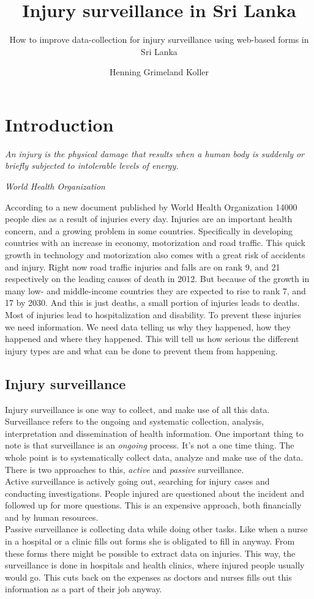 \documentclass[UKenglish, 12pt]{article}
\title{Injury surveillance in Sri Lanka}
\subtitle{How to improve data-collection for injury surveillance
using web-based forms in Sri Lanka}
\author{Henning Grimeland Koller}
\newcommand{\WHO}{World Health Organization }
\begin{document}
\ififorside{}
\newpage

\section*{Introduction} 
\epigraph{ \textit{An injury is the physical damage that
results when a human body is suddenly or briefly subjected to intolerable
levels of energy.}}{\textit{\WHO\cite{who-guide}}}

According to a new document published by \WHO\cite{who-article} 14000 people
dies as a result of injuries every day.  Injuries are an important health
concern, and a growing problem in some countries. Specifically in developing
countries with an increase in economy, motorization and road traffic.  This
quick growth in technology and motorization also comes with a great risk of
accidents and injury.  Right now road traffic injuries and falls are on rank 9,
and 21 respectively on the leading causes of death in
2012.\cite[4]{who-article} But because of the growth in many low- and
middle-income countries they are expected to rise to rank 7, and 17 by 2030.
And this is just deaths, a small portion of injuries leads to deaths. Most of
injuries lead to hospitalization and disability.  To prevent these injuries we
need information. We need data telling us why they happened, how they happened
and where they happened.  This will tell us how serious the different injury
types are and what can be done to prevent them from happening.

\subsection*{Injury surveillance}
Injury surveillance is one way to collect, and
make use of all this data.  Surveillance refers to the ongoing and systematic
collection, analysis, interpretation and dissemination of health
information.\cite[11]{who-guide} One important thing to note is that
surveillance is an \textit{ongoing} process.  It's not a one time thing. The
whole point is to systematically collect data, analyze and make use of the
data.  There is two approaches to this, \textit{active} and \textit{passive}
surveillance. \\Active surveillance is actively going out, searching for injury
cases and conducting investigations.  People injured are questioned about the
incident and followed up for more questions. This is an expensive approach,
both financially and by human resources. \\Passive surveillance is collecting
data while doing other tasks.  Like when a nurse in a hospital or a clinic
fills out forms she is obligated to fill in anyway. From these forms there
might be possible to extract data on injuries. This way, the surveillance is
done in hospitals and health clinics, where injured people usually would go.
This cuts back on the expenses as doctors and nurses fills out this information
as a part of their job anyway.\\
\end{document}
